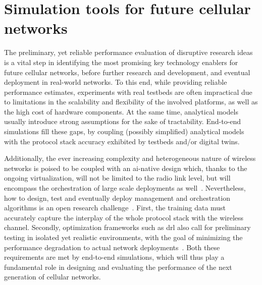 \chapter{Simulation tools for future cellular networks}
\label{ch:sim-tools}

The preliminary, yet reliable performance evaluation of disruptive research ideas is a vital step in identifying the most promising key technology enablers for future cellular networks, before further research and development, and eventual deployment in real-world networks.
To this end, while providing reliable performance estimates, experiments with real testbeds are often impractical due to limitations in the scalability and flexibility of the involved platforms, as well as the high cost of hardware components. At the same time, analytical models usually introduce strong assumptions for the sake of tractability. End-to-end simulations fill these gaps, by coupling (possibly simplified) analytical models with the protocol stack accuracy exhibited by testbeds and/or digital twins.

Additionally, the ever increasing complexity and heterogeneous nature of wireless networks is poised to be coupled with an \gls{ai}-native design which, thanks to the ongoing virtualization, will not be limited to the radio link level, but will encompass the orchestration of large scale deployments as well~\cite{polese2023understanding}.
Nevertheless, how to design, test and eventually deploy management and orchestration algorithms is an open research challenge~\cite{polese2022colo}.
First, the training data must accurately capture the interplay of the whole protocol stack with the wireless channel. Secondly, optimization frameworks such as \gls{drl} also call for preliminary testing in isolated yet realistic environments, with the goal of minimizing the performance degradation to actual network deployments~\cite{lacava2022programmable, amir2023safehaul}.
Both these requirements are met by end-to-end simulations, which will thus play a fundamental role in designing and evaluating the performance of the next generation of cellular networks.


